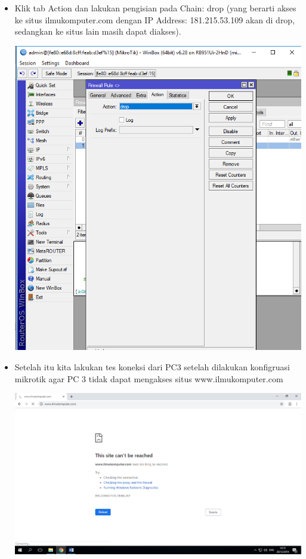 \documentclass[a4paper,12pt]{article}
\begin{document}
\begin{enumerate}
\begin{itemize}
\begin{center}
                \end{center}
            \item Klik tab Action dan lakukan pengisian pada Chain: drop (yang berarti akses ke situs ilmukomputer.com dengan IP Address: 181.215.53.109 akan di drop, sedangkan ke situs lain masih dapat diakses).
                \begin{center}
                    \includegraphics[width=0.8\linewidth]{image24.png}
                \end{center}
            \item Setelah itu kita lakukan tes koneksi dari PC3 setelah dilakukan konfigruasi mikrotik agar PC 3 tidak dapat mengakses situs www.ilmukomputer.com
                 \begin{center}
                    \includegraphics[width=0.8\linewidth]{image16.png}
                \end{center}
       \end{itemize}

\end{enumerate}
\end{document}
